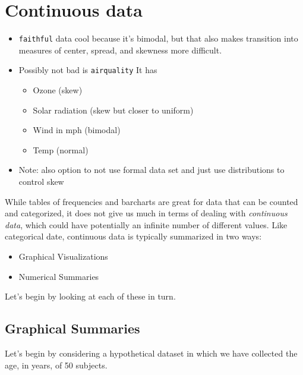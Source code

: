 \documentclass[
]{book}
\providecommand{\tightlist}{%
  \setlength{\itemsep}{0pt}\setlength{\parskip}{0pt}}
\theoremstyle{definition}
\theoremstyle{definition}
\theoremstyle{definition}
\theoremstyle{remark}
\begin{document}
\hypertarget{continuous-data}{%
\section{Continuous data}\label{continuous-data}}

\begin{itemize}
\tightlist
\item
  \texttt{faithful} data cool because it's bimodal, but that also makes transition into measures of center, spread, and skewness more difficult.
\item
  Possibly not bad is \texttt{airquality} It has

  \begin{itemize}
  \tightlist
  \item
    Ozone (skew)
  \item
    Solar radiation (skew but closer to uniform)
  \item
    Wind in mph (bimodal)
  \item
    Temp (normal)
  \end{itemize}
\item
  Note: also option to not use formal data set and just use distributions to control skew
\end{itemize}

While tables of frequencies and barcharts are great for data that can be counted and categorized, it does not give us much in terms of dealing with \emph{continuous data}, which could have potentially an infinite number of different values. Like categorical date, continuous data is typically summarized in two ways:

\begin{itemize}
\tightlist
\item
  Graphical Visualizations
\item
  Numerical Summaries
\end{itemize}

Let's begin by looking at each of these in turn.

\hypertarget{graphical-summaries}{%
\subsection{Graphical Summaries}\label{graphical-summaries}}

Let's begin by considering a hypothetical dataset in which we have collected the age, in years, of 50 subjects.
\end{document}

